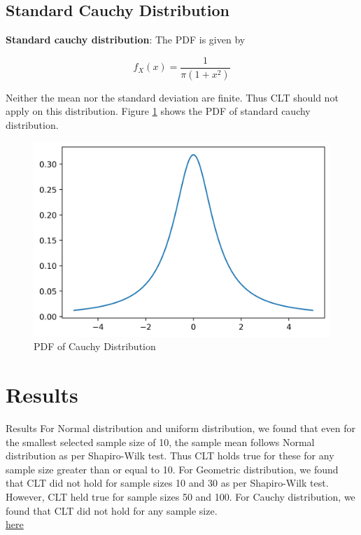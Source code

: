 \documentclass[10pt]{beamer}
\begin{document}
\begin{frame}{}
\subsection{Standard Cauchy Distribution}
\textbf{Standard cauchy distribution}: The PDF is given by
\begin{block}{}
$$f_X(x) = \dfrac{1}{\pi (1+x^2)}$$
\end{block}Neither the mean nor the standard deviation are finite. Thus CLT should not apply on this distribution. Figure \ref{cauchy_pdf} shows the PDF of standard cauchy distribution.
\end{frame}
\begin{frame}{}
    \begin{figure}[H]
        \centering
        \includegraphics[scale=0.4]{images/cauchy.png}
        \caption{PDF of Cauchy Distribution}
        \label{cauchy_pdf}
    \end{figure}
\end{frame}
\section{Results}
\begin{frame}{Results}
    For Normal distribution and uniform distribution, we found that even for the smallest selected sample size of 10, the sample mean follows Normal distribution as per Shapiro-Wilk test. Thus CLT holds true for these for any sample size greater than or equal to 10. For Geometric distribution, we found that CLT did not hold for sample sizes 10 and 30 as per Shapiro-Wilk test. However, CLT held true for sample sizes 50 and 100. For Cauchy distribution, we found that CLT did not hold for any sample size. \\
    \href{https://github.com/cmaspi/verifying_CLT/blob/main/codes/visualise_hist.ipynb}{here}
\end{frame}
\end{document}
